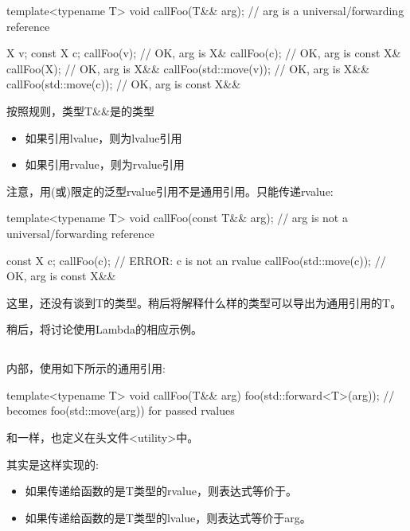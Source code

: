 \begin{cppcode}
template<typename T>
void callFoo(T&& arg); // arg is a universal/forwarding reference

X v;
const X c;
callFoo(v); // OK, arg is X&
callFoo(c); // OK, arg is const X&
callFoo(X{}); // OK, arg is X&&
callFoo(std::move(v)); // OK, arg is X&&
callFoo(std::move(c)); // OK, arg is const X&&
\end{cppcode}

按照规则，类型T\&\&是的类型

\begin{itemize}
	\item 如果引用lvalue，则为lvalue引用
	\item 如果引用rvalue，则为rvalue引用
\end{itemize}

注意，用(或)限定的泛型rvalue引用不是通用引用。只能传递rvalue:

\begin{cppcode}
template<typename T>
void callFoo(const T&& arg); // arg is not a universal/forwarding reference

const X c;
callFoo(c); // ERROR: c is not an rvalue
callFoo(std::move(c)); // OK, arg is const X&&
\end{cppcode}

这里，还没有谈到T的类型。稍后将解释什么样的类型可以导出为通用引用的T。

稍后，将讨论使用Lambda的相应示例。

\subsection{}

内部，使用如下所示的通用引用:

\begin{cppcode}
template<typename T>
void callFoo(T&& arg) {
	foo(std::forward<T>(arg)); // becomes foo(std::move(arg)) for passed rvalues
}
\end{cppcode}

和一样，也定义在头文件<utility>中。

其实是这样实现的:

\begin{itemize}
	\item 如果传递给函数的是T类型的rvalue，则表达式等价于。
	\item 如果传递给函数的是T类型的lvalue，则表达式等价于arg。
\end{itemize}


